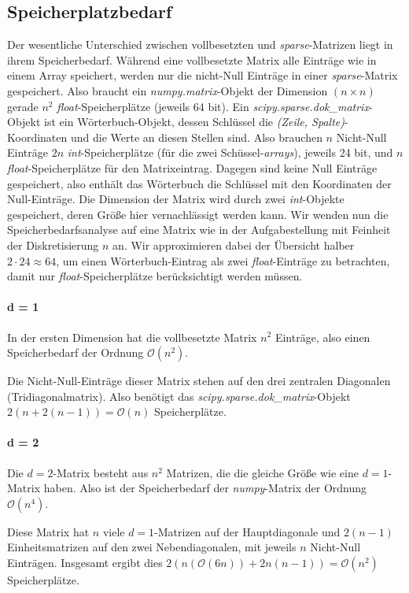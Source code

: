 \documentclass[smallheadings]{scrartcl}
\begin{document}
\subsection{Speicherplatzbedarf}
\label{sec:bedarf}
Der wesentliche Unterschied zwischen vollbesetzten und \textit{sparse}-Matrizen  liegt in ihrem Speicherbedarf. Während eine vollbesetzte Matrix alle Einträge wie in einem Array speichert, werden nur die nicht-Null Einträge in einer \textit{sparse}-Matrix gespeichert. Also braucht ein \textit{numpy.matrix}-Objekt der Dimension $(n \times n)$ gerade $n^2$ \textit{float}-Speicherplätze (jeweils 64 bit). Ein \textit{scipy.sparse.dok\_matrix}-Objekt  ist ein Wörterbuch-Objekt, dessen Schlüssel die \textit{(Zeile, Spalte)}-Koordinaten und die Werte an diesen Stellen sind. 
Also brauchen $n$ Nicht-Null Einträge $2n$ \textit{int}-Speicherplätze (für die zwei Schüssel-\textit{arrays}), jeweils 24 bit, und $n$ \textit{float}-Speicherplätze für den Matrixeintrag. Dagegen sind keine Null Einträge gespeichert, also enthält das Wörterbuch die Schlüssel mit den Koordinaten der Null-Einträge. Die Dimension der Matrix wird durch zwei \textit{int}-Objekte gespeichert, deren Größe hier vernachlässigt werden kann. Wir wenden nun die Speicherbedarfsanalyse auf eine Matrix wie in der Aufgabestellung mit Feinheit der Diskretisierung $n$ an. Wir approximieren dabei der Übersicht halber $2 \cdot 24 \approx 64$, um einen Wörterbuch-Eintrag als zwei \textit{float}-Einträge zu betrachten, damit nur \textit{float}-Speicherplätze berücksichtigt werden müssen.

\paragraph{d = 1}
In der ersten Dimension hat die vollbesetzte Matrix $n^2$ Einträge, also einen Speicherbedarf der Ordnung $\mathcal{O}(n^2)$.

Die Nicht-Null-Einträge dieser Matrix stehen auf den drei zentralen Diagonalen (Tridiagonalmatrix). Also benötigt das \textit{scipy.sparse.dok\_matrix}-Objekt $2(n+2(n-1)) = \mathcal{O}(n)$ Speicherplätze.

\paragraph{d = 2}
Die $d=2$-Matrix besteht aus $n^2$ Matrizen, die die gleiche Größe wie eine $d=1$-Matrix haben. Also ist der Speicherbedarf der \textit{numpy}-Matrix der Ordnung $\mathcal{O}(n^4)$.

 Diese Matrix hat $n$ viele $d=1$-Matrizen auf der Hauptdiagonale  und $2(n-1)$ Einheitsmatrizen auf den zwei Nebendiagonalen, mit jeweils $n$ Nicht-Null Einträgen. Insgesamt ergibt dies $2(n(\mathcal{O}(6n))+2n(n-1))=\mathcal{O}(n^2)$ Speicherplätze.
 
\end{document}
